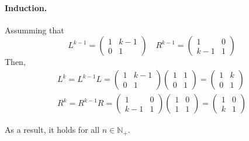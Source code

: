 \documentclass[a4paper,12pt]{article}
\makeatletter
\newtheorem*{solution}{Solution}
\theoremstyle{definition}
\renewenvironment{solution}[1][Solution] {\par\pushQED{\qed}\normalfont\topsep6\p@\@plus6\p@\relax\trivlist\item[\hskip\labelsep\bfseries#1\@addpunct{.}]\ignorespaces}{\popQED\endtrivlist\@endpefalse} \makeatother
\newenvironment{problems}{\begin{list}{}{\renewcommand{\makelabel}[1]{\textbf{##1}\hfil}}}{\end{list}}
\makeatother
\begin{document}
\begin{problems}
\begin{solution}
        \paragraph{Induction.} Assumming that 
        \begin{equation*}
            L^{k-1}=\begin{pmatrix}
                1 & k-1\\
                0 & 1
            \end{pmatrix}\quad
            R^{k-1}=\begin{pmatrix}
                1 & 0\\
                k-1 & 1
            \end{pmatrix}
        \end{equation*}
        Then, 
        \begin{align*}
            L^k=L^{k-1}L=\begin{pmatrix}
                1 & k-1\\
                0 & 1
            \end{pmatrix}\begin{pmatrix}
                1 & 1\\
                0 & 1
            \end{pmatrix}=\begin{pmatrix}
                1 & k\\
                0 & 1
            \end{pmatrix}\\
            R^k=R^{k-1}R=\begin{pmatrix}
                1 & 0\\
                k-1 & 1
            \end{pmatrix}\begin{pmatrix}
                1 & 0\\
                1 & 1
            \end{pmatrix}=\begin{pmatrix}
                1 & 0\\
                k & 1
            \end{pmatrix}
        \end{align*}

        As a result, it holds for all $n\in\mathbb{N}_+$.


\end{solution}
\end{problems}
\end{document}
